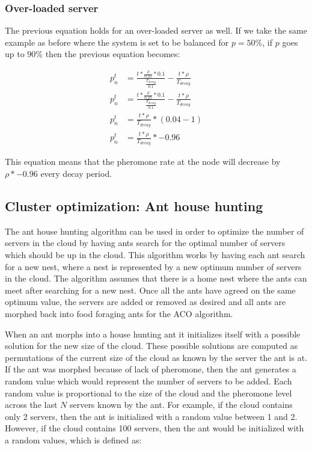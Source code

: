 \subsubsection{Over-loaded server}

The previous equation holds for an over-loaded server as well. If we take the same example as before where the system is set to be balanced for $p = 50\%$, if $p$ goes up to $90\%$ then the previous equation becomes:

\begin{equation}
\begin{aligned}
p^{t}_{n} &= \frac{t *  \frac{\rho}{0.25} * 0.1}{\frac{T_{decay}}{0.1}} - \frac{t *  \rho}{T_{decay}} \\
p^{t}_{n} &= \frac{t *  \frac{\rho}{0.25} * 0.1}{\frac{T_{decay}}{0.1}} - \frac{t *  \rho}{T_{decay}} \\
p^{t}_{n} &= \frac{t * \rho}{T_{decay}} * (0.04 - 1) \\
p^{t}_{n} &= \frac{t * \rho}{T_{decay}} * -0.96
\end{aligned}
\end{equation}

This equation means that the pheromone rate at the node will decrease by $\rho * -0.96$ every decay period.

\subsection{Cluster optimization: Ant house hunting}

The ant house hunting algorithm can be used in order to optimize the number of servers in the cloud by having ants search for the optimal number of servers which should be up in the cloud. This algorithm works by having each ant search for a new nest, where a nest is represented by a new optimum number of servers in the cloud. The algorithm assumes that there is a home nest where the ants can meet after searching for a new nest. Once all the ants have agreed on the same optimum value, the servers are added or removed as desired and all ants are morphed back into food foraging ants for the ACO algorithm. \cite{selforg:antreloc}

When an ant morphs into a house hunting ant it initializes itself with a possible solution for the new size of the cloud. These possible solutions are computed as permutations of the current size of the cloud as known by the server the ant is at. If the ant was morphed because of lack of pheromone, then the ant generates a random value which would represent the number of servers to be added. Each random value is proportional to the size of the cloud and the pheromone level across the last $N$ servers known by the ant. For example, if the cloud contains only 2 servers, then the ant is initialized with a random value between 1 and 2. However, if the cloud contains 100 servers, then the ant would be initialized with a random values, which is defined as:

